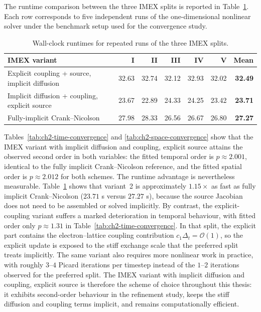 The runtime comparison between the three IMEX splits is reported in Table~\ref{tab:ch2-wallclock}. Each row corresponds to five independent runs of the one-dimensional nonlinear solver under the benchmark setup used for the convergence study.
\begin{table}[htbp]
    \centering
    \caption{Wall-clock runtimes for repeated runs of the three IMEX splits.}
    \label{tab:ch2-wallclock}
    \begin{tabular}{@{}lrrrrrr@{}}
        \toprule
        IMEX variant                                   & I     & II    & III   & IV    & V     & Mean           \\
        \midrule
        Explicit coupling + source, implicit diffusion & 32.63 & 32.74 & 32.12 & 32.93 & 32.02 & \textbf{32.49} \\
        Implicit diffusion + coupling, explicit source & 23.67 & 22.89 & 24.33 & 24.25 & 23.42 & \textbf{23.71} \\
        Fully-implicit Crank--Nicolson                 & 27.98 & 28.33 & 26.56 & 26.67 & 26.80 & \textbf{27.27} \\
        \bottomrule
    \end{tabular}
\end{table}

Tables~\ref{tab:ch2-time-convergence} and \ref{tab:ch2-space-convergence} show that the IMEX variant with implicit diffusion and coupling, explicit source attains the observed second order in both variables: the fitted temporal order is \(p \approx 2.001\), identical to the fully implicit Crank--Nicolson reference, and the fitted spatial order is \(p \approx 2.012\) for both schemes. The runtime advantage is nevertheless measurable. Table~\ref{tab:ch2-wallclock} shows that variant~2 is approximately \(1.15\times\) as fast as fully implicit Crank--Nicolson (\(23.71\) s versus \(27.27\) s), because the source Jacobian does not need to be assembled or solved implicitly. By contrast, the explicit-coupling variant suffers a marked deterioration in temporal behaviour, with fitted order only \(p \approx 1.31\) in Table~\ref{tab:ch2-time-convergence}. In that split, the explicit part contains the electron--lattice coupling contribution \(c_1\Delta_t = \mathcal{O}(1)\), so the explicit update is exposed to the stiff exchange scale that the preferred split treats implicitly. The same variant also requires more nonlinear work in practice, with roughly \(3\)–\(4\) Picard iterations per timestep instead of the \(1\)–\(2\) iterations observed for the preferred split. The IMEX variant with implicit diffusion and coupling, explicit source is therefore the scheme of choice throughout this thesis: it exhibits second-order behaviour in the refinement study, keeps the stiff diffusion and coupling terms implicit, and remains computationally efficient.
